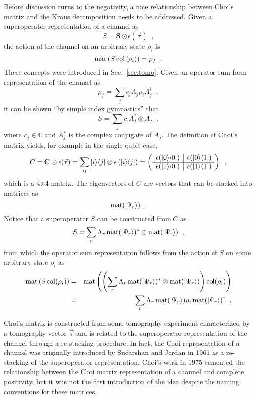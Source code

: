 Before discussion turns to the negativity, a nice relationship between Choi's matrix and the Kraus decomposition needs to be addressed.  Given a superoperator representation of a channel as
$$
S = \mathbf{S}\odot\epsilon(\vec{\tau})\;\;,
$$
the action of the channel on an arbitrary state $\rho_i$ is
$$
\operatorname{mat}\left(S\operatorname{col}\left(\rho_i\right)\right) = \rho_f\;\;.
$$
These concepts were introduced in Sec.\ \ref{sec:tomo}.  Given an operator sum form representation of the channel as
$$
\rho_f = \sum_j c_j A_j \rho_i A_j^\dagger\;\;,
$$
it can be shown ``by simple index gymnastics'' \cite{Havel2003} that
$$
S = \sum_j c_j A_j^*\otimes A_j\;\;,    
$$
where $c_j\in\mathbb{C}$ and $A_j^*$ is the complex conjugate of $A_j$.  The definition of Choi's matrix yields, for example in the single qubit case,
$$
C = \mathbf{C}\odot\epsilon(\vec{\tau}) =  \sum_{ij} |i\rangle\langle j| \otimes \epsilon\left( |i\rangle\langle j| \right) = \left(\begin{array}
{c|c} \epsilon(|0\rangle\langle0|)&\epsilon(|0\rangle\langle1|)\\
\hline
\epsilon(|1\rangle\langle0|)&\epsilon(|1\rangle\langle1|)
\end{array}\right)\;\;,
$$
which is a 4$\times $4 matrix.  The eigenvectors of $C$ are vectors that can be stacked into matrices as
$$
\operatorname{mat}(\left|\Psi_r\right\rangle)\;\;.
$$
Notice that a superoperator $S$ can be constructed from $C$ as \cite{Havel2003}
$$
S = \sum_r \Lambda_r \operatorname{mat}(\left|\Psi_r\right\rangle)^*\otimes \operatorname{mat}(\left|\Psi_r\right\rangle)\;\;,
$$
from which the operator sum representation follows from the action of $S$ on some arbitrary state $\rho_i$ as
\begin{eqnarray*}
\operatorname{mat}\left(S\operatorname{col}(\rho_i)\right) &=& \operatorname{mat}\left(\left(\sum_r \Lambda_r \operatorname{mat}(\left|\Psi_r\right\rangle)^*\otimes \operatorname{mat}(\left|\Psi_r\right\rangle)\right)\operatorname{col}(\rho_i)\right)\\
 &=& \sum_r \Lambda_r \operatorname{mat}(\left|\Psi_r\right\rangle)\rho_i \operatorname{mat}(\left|\Psi_r\right\rangle)^\dagger\;\;.
\end{eqnarray*}

Choi's matrix is constructed from some tomography experiment characterized by a tomography vector $\vec{\tau}$ and is related to the superoperator representation of the channel through a re-stacking procedure.  In fact, the Choi representation of a channel was originally introduced by Sudarshan and Jordan in 1961 \cite{Sudarshan1961} as a re-stacking of the superoperator representation.  Choi's work in 1975 \cite{Choi1975} cemented the relationship between the Choi matrix representation of a channel and complete positivity, but it was not the first introduction of the idea despite the naming conventions for these matrices.

